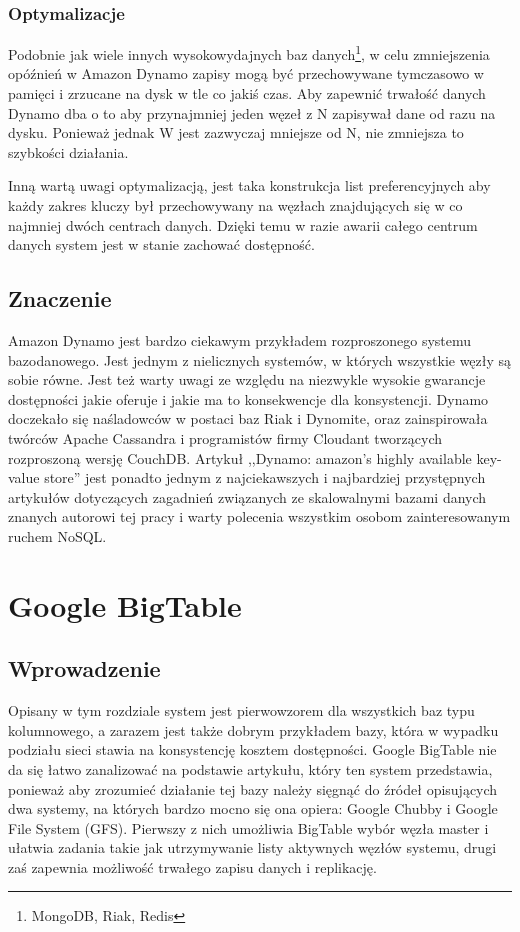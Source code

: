 \subsubsection*{Optymalizacje}

Podobnie jak wiele innych wysokowydajnych baz danych\footnote{MongoDB, Riak, Redis}, w celu zmniejszenia opóźnień w Amazon Dynamo zapisy mogą być przechowywane tymczasowo w pamięci i zrzucane na dysk w tle co jakiś czas.
Aby zapewnić trwałość danych Dynamo dba o to aby przynajmniej jeden węzeł z N zapisywał dane od razu na dysku.
Ponieważ jednak W jest zazwyczaj mniejsze od N, nie zmniejsza to szybkości działania.

Inną wartą uwagi optymalizacją, jest taka konstrukcja list preferencyjnych aby każdy zakres kluczy był przechowywany na węzłach znajdujących się w co najmniej dwóch centrach danych.
Dzięki temu w razie awarii całego centrum danych system jest w stanie zachować dostępność.

\subsection*{Znaczenie}

Amazon Dynamo jest bardzo ciekawym przykładem rozproszonego systemu bazodanowego.
Jest jednym z nielicznych systemów, w których wszystkie węzły są sobie równe.
Jest też warty uwagi ze względu na niezwykle wysokie gwarancje dostępności jakie oferuje i jakie ma to konsekwencje dla konsystencji.
Dynamo doczekało się naśladowców w postaci baz Riak i Dynomite, oraz zainspirowała twórców Apache Cassandra i programistów firmy Cloudant tworzących rozproszoną wersję CouchDB.
Artykuł ,,Dynamo: amazon's highly available key-value store'' \cite{amazon-dynamo} jest ponadto jednym z najciekawszych i najbardziej przystępnych artykułów dotyczących zagadnień związanych ze skalowalnymi bazami danych znanych autorowi tej pracy i warty polecenia wszystkim osobom zainteresowanym ruchem NoSQL.

\section{Google BigTable}

\subsection*{Wprowadzenie}

Opisany w tym rozdziale system jest pierwowzorem dla wszystkich baz typu kolumnowego, a zarazem jest także dobrym przykładem bazy, która w wypadku podziału sieci stawia na konsystencję kosztem dostępności.
Google BigTable nie da się łatwo zanalizować na podstawie artykułu, który ten system przedstawia, ponieważ aby zrozumieć działanie tej bazy należy sięgnąć do źródeł opisujących dwa systemy, na których bardzo mocno się ona opiera: Google Chubby i Google File System (GFS).
Pierwszy z nich umożliwia BigTable wybór węzła master i ułatwia zadania takie jak utrzymywanie listy aktywnych węzłów systemu, drugi zaś zapewnia możliwość trwałego zapisu danych i replikację.


